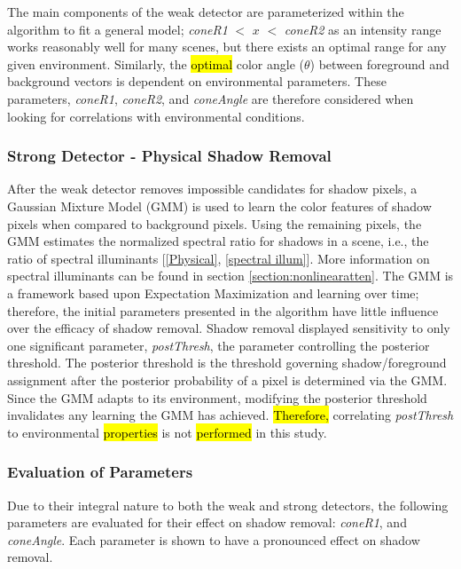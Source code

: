 The main components of the weak detector are parameterized within the algorithm to fit a general model; \textit{coneR1} $<$ $x$ $<$ \textit{coneR2} as an intensity range works reasonably well for many scenes, but there exists an optimal range for any given environment. Similarly, the \hl{optimal} color angle ($\theta$) between foreground and background vectors is dependent on environmental parameters. These parameters, \textit{coneR1}, \textit{coneR2}, and \textit{coneAngle} are therefore considered when looking for correlations with environmental conditions.

\subsubsection{Strong Detector - Physical Shadow Removal}

After the weak detector removes impossible candidates for shadow pixels, a Gaussian Mixture Model (GMM) is used to learn the color features of shadow pixels when compared to background pixels. Using the remaining pixels, the GMM estimates the normalized spectral ratio for shadows in a scene, i.e., the ratio of spectral illuminants [\ref{Physical}, \ref{spectral illum}]. More information on spectral illuminants can be found in section \ref{section:nonlinearatten}. The GMM is a framework based upon Expectation Maximization and learning over time; therefore, the initial parameters presented in the algorithm have little influence over the efficacy of shadow removal. Shadow removal displayed sensitivity to only one significant parameter, \textit{postThresh}, the parameter controlling the posterior threshold. The posterior threshold is the threshold governing shadow/foreground assignment after the posterior probability of a pixel is determined via the GMM. Since the GMM adapts to its environment, modifying the posterior threshold invalidates any learning the GMM has achieved. \hl{Therefore,} correlating \textit{postThresh} to environmental \hl{properties} is not \hl{performed} in this study.

\subsubsection{Evaluation of Parameters}

Due to their integral nature to both the weak and strong detectors, the following parameters are evaluated for their effect on shadow removal: \textit{coneR1}, and \textit{coneAngle}. Each parameter is shown to have a pronounced effect on shadow removal. 

